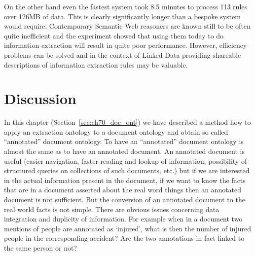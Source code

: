 On the other hand even the fastest system took 8.5 minutes to process 113 rules over 126MB of data. This is clearly   significantly longer than a bespoke system would require. 
Contemporary Semantic Web reasoners are known still to be often quite inefficient and the experiment showed that using them today to do information extraction will result in quite poor performance. However, efficiency problems can be solved
and in the context of Linked Data providing shareable descriptions of information extraction rules may be valuable.





%
\section{Discussion} \label{sec:discuss}


In this chapter (Section~\ref{sec:ch70_doc_ont}) we have described a method how to apply an extraction ontology to a document ontology and obtain so called ``annotated'' document ontology. To have an ``annotated'' document ontology is almost the same as to have an annotated document. An annotated document is useful (easier navigation, faster reading and lookup of information, possibility of structured queries on collections of such documents, etc.) but if we are interested in the actual information present in the document, if we want to know the facts that are in a document asserted about the real word things then an annotated document is not sufficient. But the conversion of an annotated document to the real world facts is not simple.
There are obvious issues concerning data integration and duplicity of information. For example when in a document two mentions of people are annotated as `injured', what is then the number of injured people in the corresponding accident? Are the two annotations in fact linked to the same person or not?

